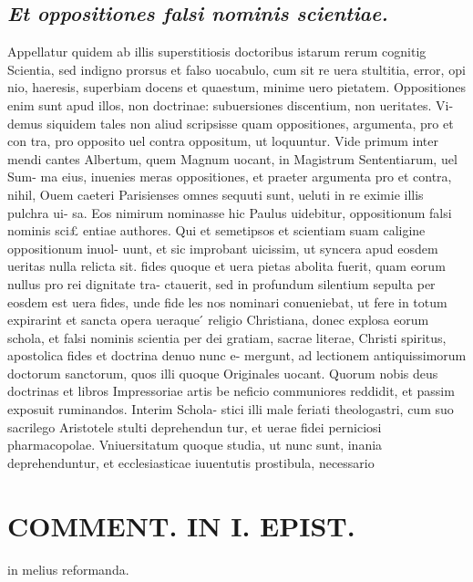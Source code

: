 \documentclass{article}
\begin{document}
\begin{pages}
\subsection*{\textit{Et oppositiones falsi nominis scientiae. }}\pstart Appellatur quidem ab illis superstitiosis doctoribus istarum rerum cognitig Scientia, sed indigno prorsus et falso uocabulo, cum sit re uera stultitia, error, opi nio, haeresis, superbiam docens et quaestum, minime uero pietatem. Oppositiones enim sunt apud illos, non doctrinae: subuersiones discentium, non ueritates. Vi- demus siquidem tales non aliud scripsisse quam oppositiones, argumenta, pro et con tra, pro opposito uel contra oppositum, ut loquuntur. Vide primum inter mendi cantes Albertum, quem Magnum uocant, in Magistrum Sententiarum, uel Sum- ma eius, inuenies meras oppositiones, et praeter argumenta pro et contra, nihil, Ouem caeteri Parisienses omnes sequuti sunt, ueluti in re eximie illis pulchra ui- sa. Eos nimirum nominasse hic Paulus uidebitur, oppositionum falsi nominis sci£ entiae authores. Qui et semetipsos et scientiam suam caligine oppositionum inuol- uunt, et sic improbant uicissim, ut syncera apud eosdem ueritas nulla relicta sit. fides quoque et uera pietas abolita fuerit, quam eorum nullus pro rei dignitate tra- ctauerit, sed in profundum silentium sepulta per eosdem est uera fides, unde fide les nos nominari conueniebat, ut fere in totum expirarint et sancta opera ueraque ́ religio Christiana, donec explosa eorum schola, et falsi nominis scientia per dei gratiam, sacrae literae, Christi spiritus, apostolica fides et doctrina denuo nunc e- mergunt, ad lectionem antiquissimorum doctorum sanctorum, quos illi quoque Originales uocant. Quorum nobis deus doctrinas et libros Impressoriae artis be neficio communiores reddidit, et passim exposuit ruminandos. Interim Schola- stici illi male feriati theologastri, cum suo sacrilego Aristotele stulti deprehendun tur, et uerae fidei perniciosi pharmacopolae. Vniuersitatum quoque studia, ut nunc sunt, inania deprehenduntur, et ecclesiasticae iuuentutis prostibula, necessario  \pend
\section*{COMMENT. IN I. EPIST. }
\marginpar{[ p.544 ]}\pstart in melius reformanda.  \pend
{}
{}

\end{pages}
\end{document}
